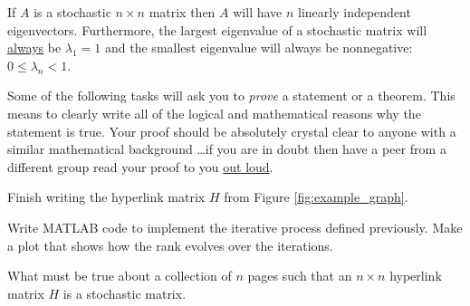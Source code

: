 \begin{thm} \label{thm:largest_ev_stochastic}
    If $A$ is a stochastic $n \times n$ matrix then $A$ will have $n$ linearly independent
    eigenvectors.  Furthermore, the largest eigenvalue of a stochastic matrix will
    \underline{always} be $\lambda_1 = 1$ and the smallest eigenvalue  will always be
    nonnegative: $0 \le \lambda_n < 1$.
\end{thm}

Some of the following tasks will ask you to {\it prove} a statement or a theorem.  This
means to clearly write all of the logical and mathematical reasons why the statement is
true. Your proof should be absolutely crystal clear to anyone with a similar mathematical
background \dots if you are in doubt then have a peer from a different group read your
proof to you \underline{out loud}.

\begin{problem}
    Finish writing the hyperlink matrix $H$ from Figure \ref{fig:example_graph}.
\end{problem}

\begin{problem}
    Write MATLAB code to implement the iterative process defined previously. Make a plot
    that shows how the rank evolves over the iterations.
\end{problem}


\begin{problem}
    What must be true about a collection of $n$ pages such that an $n\times n$
        hyperlink matrix $H$ is a stochastic matrix.
\end{problem}

